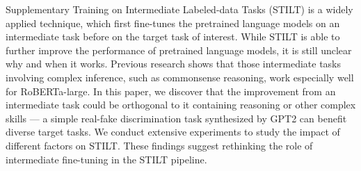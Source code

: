 Supplementary Training on Intermediate Labeled-data Tasks (STILT) is a widely applied technique, which first fine-tunes the pretrained language models on an intermediate task before on the target task of interest. While STILT is able to further improve the performance of pretrained language models, it is still unclear why and when it works. Previous research shows that those intermediate tasks involving complex inference, such as commonsense reasoning, work especially well for  RoBERTa-large. In this paper, we discover that the improvement from an intermediate task could be orthogonal to it containing reasoning or other complex skills --- a simple real-fake discrimination task synthesized by GPT2 can benefit diverse target tasks. We conduct extensive experiments to study the impact of different factors on STILT. These findings suggest rethinking the role of intermediate fine-tuning in the STILT pipeline.
